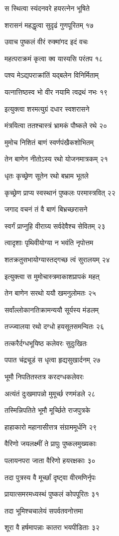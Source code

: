 स स्थित्वा स्यंदनवरे हयरत्नेन भूषिते

शरासनं महद्धृत्वा सुदृढं गुणपूरितम् १७

उवाच पुष्कलं वीरं रुक्मांगद इदं वचः

महत्पराक्रमं कृत्वा क्व यास्यसि परंतप १८

पश्य मेऽद्यपराक्रांतिं यद्बलेन विनिर्मिताम्

यत्नात्तिष्ठस्व भो वीर नयामि त्वद्रथं नभः १९

इत्युक्त्वा शरमत्युग्रं दधार स्वशरासने

मंत्रयित्वा ततश्चास्त्रं भ्रामकं पौष्कले रथे २०

मुमोच निशितं बाणं स्वर्णपंखैकशोभितम्

तेन बाणेन नीतोऽस्य रथो योजनमात्रकम् २१

धृतः कृच्छ्रेण सूतेन रथो बभ्राम भूतले

कृच्छ्रेण प्राप्य स्वस्थानं पुष्कलः परमास्त्रवित् २२

जगाद वचनं तं वै बाणं बिभ्रच्छरासने

स्वर्गं प्राप्नुहि वीराग्र्य सर्वदेवैश्च सेवितम् २३

त्वादृशाः पृथिवीयोग्या न भवंति नृपोत्तम

शतक्रतुसभायोग्यास्तद्गच्छ त्वं सुरालयम् २४

इत्युक्त्वा स मुमोचास्त्रमाकाशप्रापकं महत्

तेन बाणेन सरथो ययौ खमनुलोमतः २५

सर्वांल्लोकानतिक्रामन्ययौ सूर्यस्य मंडलम्

तज्ज्वालया रथो दग्धो हयसूतसमन्वितः २६

तत्करैर्दग्धभूयिष्ठ कलेवरः सुदुःखितः

पपात चंद्रचूडं स धृत्वा हृद्यसुखार्दनम् २७

भूमौ निपतितस्तत्र करदग्धकलेवरः

अत्यंतं दुःखमापन्नो मुमूर्च्छ रणमंडले २८

तस्मिन्निपतिते भूमौ मूर्च्छिते राजपुत्रके

हाहाकारो महानासीत्तत्र संग्राममूर्धनि २९

वैरिणो जयलक्ष्मीं ते प्रापुः पुष्कलमुख्यकाः

पलायनपरा जाता वैरिणो हयरक्षकाः ३०

तदा पुत्रस्य वै मूर्च्छां दृष्ट्वा वीरमणिर्नृपः

प्रायात्समरमध्यस्थं पुष्कलं कोपपूरितः ३१

तदा भूमिश्चचालेयं सपर्वतवनोत्तमा

शूरा वै हर्षमापन्नाः कातरा भयपीडिताः ३२

